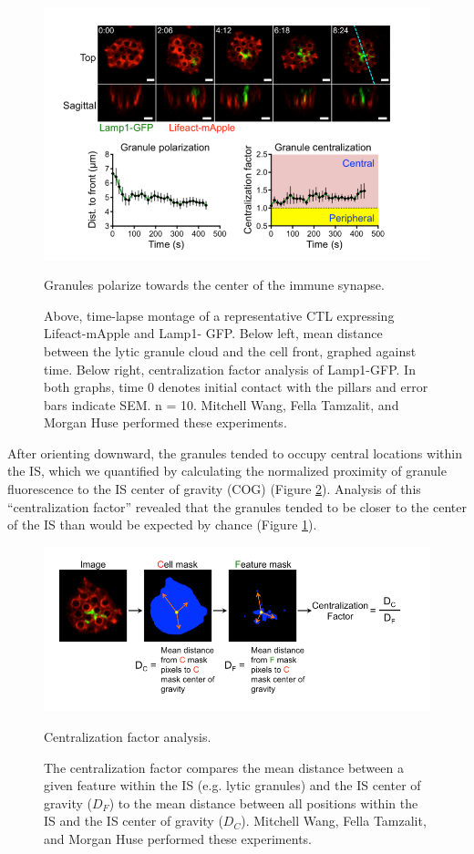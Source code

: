 \begin{figure}[htbp]
	\centering
	\includegraphics[width=\textwidth]{../figures/chapter2/fig1granulecentralization.png}
	\caption{Granules polarize towards the center of the immune synapse.}
	\caption*{Above, time-lapse montage of a representative CTL expressing Lifeact-mApple and Lamp1- GFP. Below left, mean distance between the lytic granule cloud and the cell front, graphed against time. Below right, centralization factor analysis of Lamp1-GFP. In both graphs, time 0 denotes initial contact with the pillars and error bars indicate SEM. n = 10. Mitchell Wang, Fella Tamzalit, and Morgan Huse performed these experiments.}
	\label{fig:fig1granulecentralization}
\end{figure}

After orienting downward, the granules tended to occupy central locations within the IS, which we quantified by calculating the normalized proximity of granule fluorescence to the IS center of gravity (COG) (Figure \ref{fig:fig1centralizationfactor}). Analysis of this “centralization factor” revealed that the granules tended to be closer to the center of the IS than would be expected by chance (Figure \ref{fig:fig1granulecentralization}).

\begin{figure}[htbp]
	\centering
	\includegraphics[width=\textwidth]{../figures/chapter2/fig1centralizationfactor.png}
	\caption{Centralization factor analysis.}
	\caption*{The centralization factor compares the mean distance between a given feature within the IS (e.g. lytic granules) and the IS center of gravity ($D_F$) to the mean distance between all positions within the IS and the IS center of gravity ($D_C$). Mitchell Wang, Fella Tamzalit, and Morgan Huse performed these experiments.}
	\label{fig:fig1centralizationfactor}
\end{figure}

